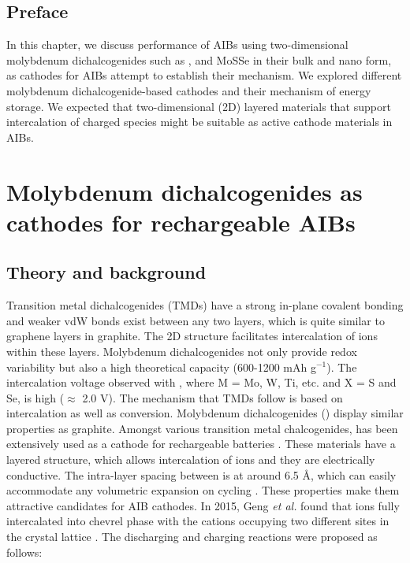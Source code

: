 \section*{Preface}
In this chapter, we discuss performance of AIBs using two-dimensional molybdenum dichalcogenides such as ,  and MoSSe in their bulk and nano form, as cathodes for AIBs attempt to establish their mechanism. We explored different molybdenum dichalcogenide-based cathodes and their mechanism of energy storage. We expected that two-dimensional (2D) layered materials that support intercalation of charged species might be suitable as active cathode materials in AIBs. 
\pagebreak
\chapter{Molybdenum dichalcogenides as cathodes for rechargeable AIBs} %

\label{chap4} %

\section{Theory and background}
Transition metal dichalcogenides (TMDs) have a strong in-plane covalent bonding and weaker vdW bonds exist between any two layers, which is quite similar to graphene layers in graphite. The 2D structure facilitates intercalation of ions within these layers. Molybdenum dichalcogenides not only provide redox variability but also a high theoretical capacity (600-1200 mAh g$^{-1}$). The intercalation voltage observed with , where M = Mo, W, Ti, etc. and X = S and Se, is high ($\approx$ 2.0 V). The mechanism that TMDs follow is based on intercalation as well as conversion. 
Molybdenum dichalcogenides () display similar properties as graphite. Amongst various transition metal chalcogenides,  has been extensively used as a cathode for rechargeable batteries \cite{li_rechargeable_2018-2, zhu_fast_2015-2}. These materials have a layered structure, which allows intercalation of ions and they are electrically conductive. The intra-layer spacing between  is at around 6.5 \AA, which can easily accommodate any volumetric expansion on cycling \cite{liang_rechargeable_2011,hu_ws2_2013}. These properties make them attractive candidates for AIB cathodes. In 2015, Geng \textit{et al.} found that  ions fully intercalated into chevrel phase  with the cations occupying two different sites in the crystal lattice \cite{geng_reversible_2015}. The discharging and charging reactions were proposed as follows:

